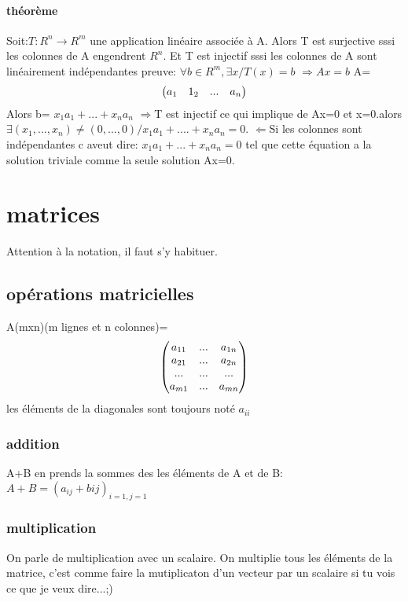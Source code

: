 \documentclass[a4paper,10pt]{article}
\begin{document}
\paragraph{théorème}
Soit:$T:R^n\rightarrow R^m$ une application linéaire associée à A. Alors T est surjective sssi les colonnes de A engendrent $R^n$. Et T est injectif sssi les colonnes de A sont linéairement indépendantes
\newline
preuve:
\newline
$\forall b\in R^m, \exists x/T(x)=b$
\newline
$\Rightarrow Ax=b$
\newline
A=
\[
\begin{pmatrix}
a_1&1_2&...&a_n\cr
\end{pmatrix}
\]
\newline
Alors b= $x_1a_1+...+x_na_n$
\newline
$\Rightarrow$T est injectif ce qui implique de Ax=0 et x=0.alors $\exists (x_1,...,x_n)\neq(0,...,0)/x_1a_1+....+x_na_n=0.$
\newline
$\Longleftarrow$Si les colonnes sont indépendantes c aveut dire: $x_1a_1+...+x_na_n=0$ tel que cette équation a la solution triviale comme la seule solution Ax=0.
\section{matrices}
Attention à la notation, il faut s'y habituer.
\subsection{opérations matricielles}
A(mxn)(m lignes et n colonnes)=
\[
\begin{pmatrix}
a_{11}&...&a_{1n}\cr
a_{21}&...&a_{2n}\cr
...&...&...\cr
a_{m1}&...&a_{mn}\cr
\end{pmatrix}
\]
\newline
les éléments de la diagonales sont toujours noté $a_{ii}$
\subsubsection{addition}
A+B en prends la sommes des les éléments de A et de B: $A+B=(a_{ij}+b{ij})_{i=1,j=1}$
\subsubsection{multiplication}
On parle de multiplication avec un scalaire. On multiplie tous les éléments de la matrice, c'est comme faire la mutiplicaton d'un vecteur par un scalaire si  tu vois ce que je veux dire...;)
\end{document}
